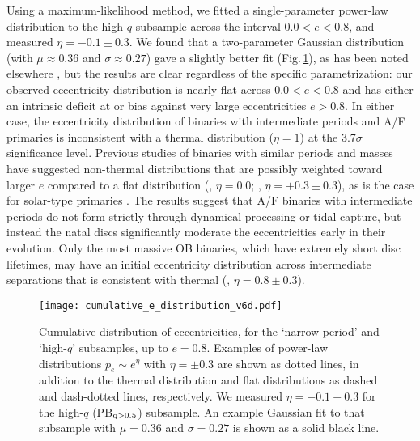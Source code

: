 \documentclass[a4paper,fleqn,usenatbib]{mnras}
\begin{document}
Using a maximum-likelihood method, we fitted a single-parameter power-law distribution to the high-$q$ subsample across the interval $0.0 < e < 0.8$, and measured $\eta = -0.1\pm0.3$.
We found that a two-parameter Gaussian distribution (with $\mu \approx 0.36$ and $\sigma \approx 0.27$) gave a slightly better fit (Fig.\,\ref{fig:cumulative_e2}), as has been noted elsewhere \citep[e.g.][]{moe&distefano2017}, but the results are clear regardless of the specific parametrization: our observed eccentricity distribution is nearly flat across $0.0 < e < 0.8$ and has either an intrinsic deficit at or bias against very large eccentricities $e > 0.8$. In either case, the eccentricity distribution of binaries with intermediate periods and A/F primaries is inconsistent with a thermal distribution ($\eta =1$) at the 3.7$\sigma$ significance level. Previous studies of binaries with similar periods and masses have suggested non-thermal distributions that are possibly weighted toward larger $e$ compared to a flat distribution (\citealt{abt2005}, $\eta = 0.0$; \citealt{moe&distefano2017}, $\eta = +0.3 \pm 0.3$), as is the case for solar-type primaries \citep{tokovinin&kiyaeva2016,moe&distefano2017}. The results suggest that A/F binaries with intermediate periods do not form strictly through dynamical processing or tidal capture, but instead the natal discs significantly moderate the eccentricities early in their evolution. Only the most massive OB binaries, which have extremely short disc lifetimes, may have an initial eccentricity distribution across intermediate separations that is consistent with thermal (\citealt{moe&distefano2015b,moe&distefano2017}, $\eta = 0.8 \pm 0.3$).


\begin{figure}
\begin{center}
\texttt{[image: cumulative\_e\_distribution\_v6d.pdf]}
\caption{Cumulative distribution of eccentricities, for the `narrow-period' and `high-$q$' subsamples, up to $e=0.8$. Examples of power-law distributions $p_e \sim e^{\eta}$ with $\eta = \pm0.3$ are shown as dotted lines, in addition to the thermal distribution and flat distributions as dashed and dash-dotted lines, respectively. We measured $\eta = -0.1\pm0.3$ for the high-$q$ (PB$_{\rm q>0.5}$) subsample. An example Gaussian fit to that subsample with $\mu=0.36$ and $\sigma=0.27$ is shown as a solid black line.}
\label{fig:cumulative_e2}
\end{center}
\end{figure}
\end{document}
